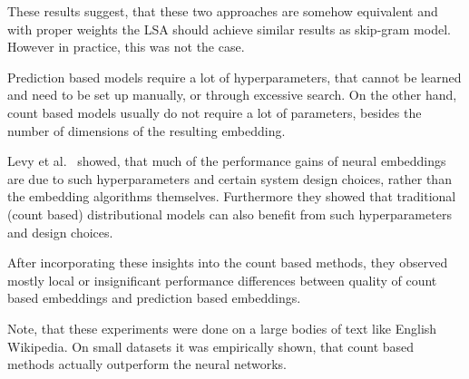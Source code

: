     These results suggest, that these two approaches are somehow equivalent and with proper weights the LSA should achieve similar results as skip-gram model. 
    However in practice, this was not the case.
    
    Prediction based models require a lot of hyperparameters, that cannot be learned and need to be set up manually,
    or through excessive search.
    On the other hand, count based models usually do not require a lot of parameters, besides the number of dimensions of the resulting embedding. 
    
    Levy et al.~\cite{levy2015improving} %
    showed, that much  of  the  performance  gains  of  neural embeddings  are  due  to such hyperparameters and certain system design choices, rather than the embedding algorithms themselves. 
    Furthermore they showed that traditional (count based) distributional models
    can also benefit from such hyperparameters and design choices.
    
    After incorporating these insights into the count based methods, 
    they observed mostly local or insignificant performance differences between quality of count based embeddings and prediction based embeddings.
    
    Note, that these experiments were done on a large bodies of text like English Wikipedia.   
    On small datasets it was empirically shown, that count based methods actually outperform the neural networks\cite{altszyler2016comparative}. %
    
    
